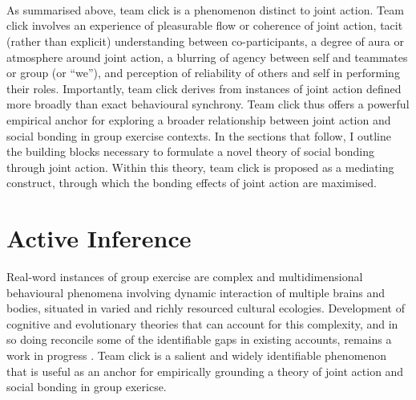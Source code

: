 \begin{CJK}{UTF8}{gbsn}
    \\
    \\
    \\



    As summarised above, team click is a phenomenon distinct to joint action.  Team click involves an experience of pleasurable flow or coherence of joint action, tacit (rather than explicit) understanding between co-participants, a degree of aura or atmosphere around joint action, a blurring of agency between self and teammates or group (or ``we''), and perception of reliability of others and self in performing their roles.  Importantly, team click derives from instances of joint action defined more broadly than exact behavioural synchrony. Team click thus offers a powerful empirical anchor for exploring a broader relationship between joint action and social bonding in group exercise contexts.  In the sections that follow, I outline the building blocks necessary to formulate a novel theory of social bonding through joint action. Within this theory, team click is proposed as a mediating construct, through which the bonding effects of joint action are maximised.


\section{Active Inference \label{sect:activeIn}}

Real-word instances of group exercise are complex and multidimensional behavioural phenomena involving dynamic interaction of multiple brains and bodies, situated in varied and richly resourced cultural ecologies.  Development of cognitive and evolutionary theories that can account for this complexity, and in so doing reconcile some of the identifiable gaps in existing accounts, remains a work in progress \citep{Fuentes2016}.  Team click is a salient and widely identifiable phenomenon that is useful as an anchor for empirically grounding a theory of joint action and social bonding in group exericse.


\end{CJK}
